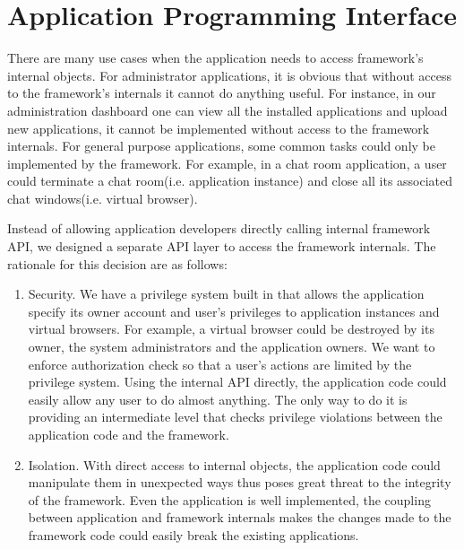 \chapter{Application Programming Interface}
\label{ch:api}
There are many use cases when the application needs
to access framework's internal objects.
For administrator applications, 
it is obvious that without access to the framework's internals
it cannot do anything useful.
For instance, in our administration dashboard one can
view all the installed applications and upload new applications,
it cannot be implemented without access to the framework internals.
For general purpose applications,
some common tasks could only be implemented by the framework.
For example, 
in a chat room application,
a user could terminate a chat room(i.e. application instance) 
and close all its associated chat windows(i.e. virtual browser).

Instead of allowing application developers directly calling internal framework API,
we designed a separate API layer to access the framework internals.
The rationale for this decision are as follows:
\begin{enumerate}
\item Security. We have a privilege system built in \cb that allows the application
specify its owner account and user's privileges to application instances and virtual browsers.
For example, a virtual browser could be destroyed by its owner,
the system administrators and the application owners. 
We want to enforce authorization check so that a user's actions 
are limited by the privilege system.
Using the internal API directly, the application code could easily allow
any user to do almost anything.
The only way to do it is providing an intermediate level 
that checks privilege violations between the application code and the framework.

\item Isolation. With direct access to internal objects, the application 
code could manipulate them in unexpected ways thus poses great threat to 
the integrity of the framework. Even the application is well implemented,
the coupling between application and framework internals makes
the changes made to the framework code could easily break the existing applications.
\end{enumerate}


